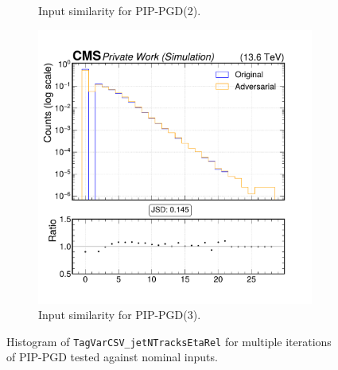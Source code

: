 \begin{figure}[h]
\begin{subfigure}[t]{0.32\textwidth}
    \caption*{Input similarity for PIP-PGD(2).}
  \end{subfigure}\hfill
  \begin{subfigure}[t]{0.32\textwidth}
    \includegraphics[width=\linewidth]{media/output/features/compare/combined_it_3/cmp_global_features_TagVarCSV_jetNTracksEtaRel.pdf}
    \caption*{Input similarity for PIP-PGD(3).}
  \end{subfigure}

  \caption*{Histogram of \texttt{TagVarCSV\_jetNTracksEtaRel} for multiple iterations of PIP-PGD tested against nominal inputs.}
  \label{fig:combined_input_TagVarCSV_jetNTracksEtaRel}
\end{figure}

